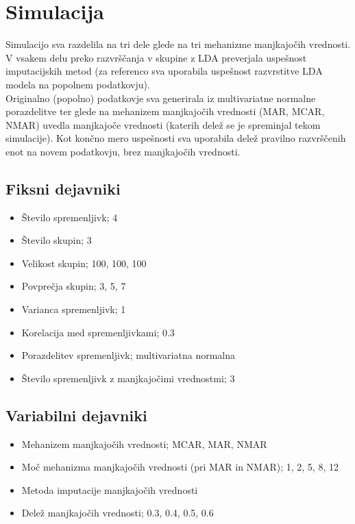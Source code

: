 \documentclass[12pt,a4paper]{article}
\begin{document}
\pagebreak

\section{Simulacija}

Simulacijo sva razdelila na tri dele glede na tri mehanizme manjkajočih vrednosti. V vsakem delu preko razvrščanja v skupine z LDA preverjala uspešnost imputacijskih metod (za referenco sva uporabila uspešnost razvrstitve LDA modela na popolnem podatkovju).\\
Originalno (popolno) podatkovje sva generirala iz multivariatne normalne porazdelitve ter glede na mehanizem manjkajočih vrednosti (MAR, MCAR, NMAR) uvedla manjkajoče vrednosti (katerih delež se je spreminjal tekom simulacije). Kot končno mero uspešnosti sva uporabila delež pravilno razvrščenih enot na novem podatkovju, brez manjkajočih vrednosti.

\subsection{Fiksni dejavniki}
\begin{itemize}
    \item Število spremenljivk; 4
    \item Število skupin; 3
    \item Velikost skupin; 100, 100, 100
    \item Povprečja skupin; 3, 5, 7
    \item Varianca spremenljivk; 1
    \item Korelacija med spremenljivkami; 0.3
    \item Porazdelitev spremenljivk; multivariatna normalna
    \item Število spremenljivk z manjkajočimi vrednostmi; 3
\end{itemize}   


\subsection{Variabilni dejavniki}
\begin{itemize}
    \item Mehanizem manjkajočih vrednosti; MCAR, MAR, NMAR
    \item Moč mehanizma manjkajočih vrednosti (pri MAR in NMAR); 1, 2, 5, 8, 12
    \item Metoda imputacije manjkajočih vrednosti
    \item Delež manjkajočih vrednosti; 0.3, 0.4, 0.5, 0.6
\end{itemize}
\end{document}
